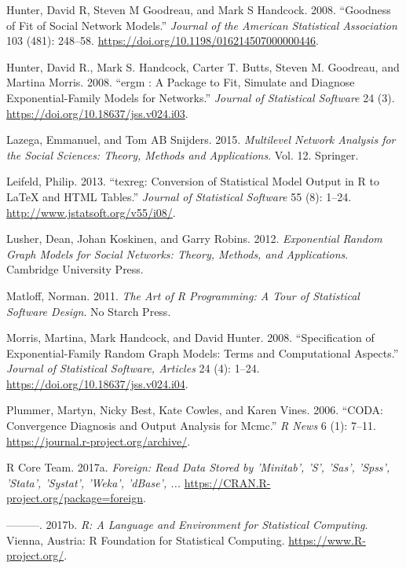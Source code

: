 \documentclass[]{book}
\begin{document}
\leavevmode\hypertarget{ref-HunterJASA2008}{}%
Hunter, David R, Steven M Goodreau, and Mark S Handcock. 2008. ``Goodness of Fit of Social Network Models.'' \emph{Journal of the American Statistical Association} 103 (481): 248--58. \url{https://doi.org/10.1198/016214507000000446}.

\leavevmode\hypertarget{ref-Hunter2008}{}%
Hunter, David R., Mark S. Handcock, Carter T. Butts, Steven M. Goodreau, and Martina Morris. 2008. ``ergm : A Package to Fit, Simulate and Diagnose Exponential-Family Models for Networks.'' \emph{Journal of Statistical Software} 24 (3). \url{https://doi.org/10.18637/jss.v024.i03}.

\leavevmode\hypertarget{ref-lazega2015}{}%
Lazega, Emmanuel, and Tom AB Snijders. 2015. \emph{Multilevel Network Analysis for the Social Sciences: Theory, Methods and Applications}. Vol. 12. Springer.

\leavevmode\hypertarget{ref-R-texreg}{}%
Leifeld, Philip. 2013. ``texreg: Conversion of Statistical Model Output in R to LaTeX and HTML Tables.'' \emph{Journal of Statistical Software} 55 (8): 1--24. \url{http://www.jstatsoft.org/v55/i08/}.

\leavevmode\hypertarget{ref-lusher2012}{}%
Lusher, Dean, Johan Koskinen, and Garry Robins. 2012. \emph{Exponential Random Graph Models for Social Networks: Theory, Methods, and Applications}. Cambridge University Press.

\leavevmode\hypertarget{ref-Matloff2011}{}%
Matloff, Norman. 2011. \emph{The Art of R Programming: A Tour of Statistical Software Design}. No Starch Press.

\leavevmode\hypertarget{ref-Morris2008}{}%
Morris, Martina, Mark Handcock, and David Hunter. 2008. ``Specification of Exponential-Family Random Graph Models: Terms and Computational Aspects.'' \emph{Journal of Statistical Software, Articles} 24 (4): 1--24. \url{https://doi.org/10.18637/jss.v024.i04}.

\leavevmode\hypertarget{ref-R-coda}{}%
Plummer, Martyn, Nicky Best, Kate Cowles, and Karen Vines. 2006. ``CODA: Convergence Diagnosis and Output Analysis for Mcmc.'' \emph{R News} 6 (1): 7--11. \url{https://journal.r-project.org/archive/}.

\leavevmode\hypertarget{ref-R-foreign}{}%
R Core Team. 2017a. \emph{Foreign: Read Data Stored by 'Minitab', 'S', 'Sas', 'Spss', 'Stata', 'Systat', 'Weka', 'dBase', ...} \url{https://CRAN.R-project.org/package=foreign}.

\leavevmode\hypertarget{ref-R}{}%
---------. 2017b. \emph{R: A Language and Environment for Statistical Computing}. Vienna, Austria: R Foundation for Statistical Computing. \url{https://www.R-project.org/}.
\end{document}
